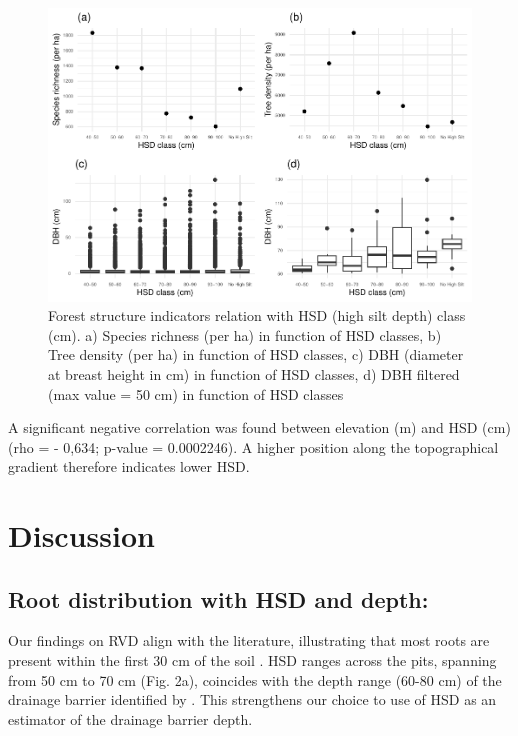 \documentclass[fleqn,12pt]{latex/stylish_article} %
\begin{document}
\begin{figure}

{\centering \includegraphics[width=0.8\linewidth,]{pedoP16-report_files/figure-latex/auger-1} 

}

\caption{Forest structure indicators relation with HSD (high silt depth) class (cm). a) Species richness (per ha) in function of HSD classes, b) Tree density (per ha) in function of HSD classes, c) DBH (diameter at breast height in cm) in function of HSD classes, d) DBH filtered (max value = 50 cm) in function of HSD classes}\label{fig:auger}
\end{figure}

\normalsize

A significant negative correlation was found between elevation (m) and HSD (cm) (rho = - 0,634; p-value = 0.0002246). A higher position along the topographical gradient therefore indicates lower HSD.

\hypertarget{discussion}{%
\section{Discussion}\label{discussion}}

\hypertarget{root-distribution-with-hsd-and-depth}{%
\subsection{Root distribution with HSD and depth:}\label{root-distribution-with-hsd-and-depth}}

Our findings on RVD align with the literature, illustrating that most roots are present within the first 30 cm of the soil \citep{freschetStartingGuideRoot2021, schenkGlobalBiogeographyRoots2002}. HSD ranges across the pits, spanning from 50 cm to 70 cm (Fig. 2a), coincides with the depth range (60-80 cm) of the drainage barrier identified by \citet{epronSpatialVariationSoil2006}. This strengthens our choice to use of HSD as an estimator of the drainage barrier depth.
\end{document}
